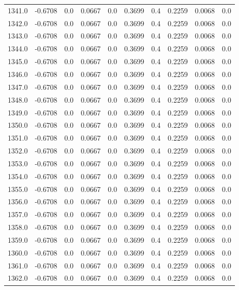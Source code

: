 \begin{longtable}{lrrrrrrrrr}
1341.0 & -0.6708 & 0.0 & 0.0667 & 0.0 & 0.3699 & 0.4 & 0.2259 & 0.0068 & 0.0 \\
1342.0 & -0.6708 & 0.0 & 0.0667 & 0.0 & 0.3699 & 0.4 & 0.2259 & 0.0068 & 0.0 \\
1343.0 & -0.6708 & 0.0 & 0.0667 & 0.0 & 0.3699 & 0.4 & 0.2259 & 0.0068 & 0.0 \\
1344.0 & -0.6708 & 0.0 & 0.0667 & 0.0 & 0.3699 & 0.4 & 0.2259 & 0.0068 & 0.0 \\
1345.0 & -0.6708 & 0.0 & 0.0667 & 0.0 & 0.3699 & 0.4 & 0.2259 & 0.0068 & 0.0 \\
1346.0 & -0.6708 & 0.0 & 0.0667 & 0.0 & 0.3699 & 0.4 & 0.2259 & 0.0068 & 0.0 \\
1347.0 & -0.6708 & 0.0 & 0.0667 & 0.0 & 0.3699 & 0.4 & 0.2259 & 0.0068 & 0.0 \\
1348.0 & -0.6708 & 0.0 & 0.0667 & 0.0 & 0.3699 & 0.4 & 0.2259 & 0.0068 & 0.0 \\
1349.0 & -0.6708 & 0.0 & 0.0667 & 0.0 & 0.3699 & 0.4 & 0.2259 & 0.0068 & 0.0 \\
1350.0 & -0.6708 & 0.0 & 0.0667 & 0.0 & 0.3699 & 0.4 & 0.2259 & 0.0068 & 0.0 \\
1351.0 & -0.6708 & 0.0 & 0.0667 & 0.0 & 0.3699 & 0.4 & 0.2259 & 0.0068 & 0.0 \\
1352.0 & -0.6708 & 0.0 & 0.0667 & 0.0 & 0.3699 & 0.4 & 0.2259 & 0.0068 & 0.0 \\
1353.0 & -0.6708 & 0.0 & 0.0667 & 0.0 & 0.3699 & 0.4 & 0.2259 & 0.0068 & 0.0 \\
1354.0 & -0.6708 & 0.0 & 0.0667 & 0.0 & 0.3699 & 0.4 & 0.2259 & 0.0068 & 0.0 \\
1355.0 & -0.6708 & 0.0 & 0.0667 & 0.0 & 0.3699 & 0.4 & 0.2259 & 0.0068 & 0.0 \\
1356.0 & -0.6708 & 0.0 & 0.0667 & 0.0 & 0.3699 & 0.4 & 0.2259 & 0.0068 & 0.0 \\
1357.0 & -0.6708 & 0.0 & 0.0667 & 0.0 & 0.3699 & 0.4 & 0.2259 & 0.0068 & 0.0 \\
1358.0 & -0.6708 & 0.0 & 0.0667 & 0.0 & 0.3699 & 0.4 & 0.2259 & 0.0068 & 0.0 \\
1359.0 & -0.6708 & 0.0 & 0.0667 & 0.0 & 0.3699 & 0.4 & 0.2259 & 0.0068 & 0.0 \\
1360.0 & -0.6708 & 0.0 & 0.0667 & 0.0 & 0.3699 & 0.4 & 0.2259 & 0.0068 & 0.0 \\
1361.0 & -0.6708 & 0.0 & 0.0667 & 0.0 & 0.3699 & 0.4 & 0.2259 & 0.0068 & 0.0 \\
1362.0 & -0.6708 & 0.0 & 0.0667 & 0.0 & 0.3699 & 0.4 & 0.2259 & 0.0068 & 0.0 \\

\end{longtable}
